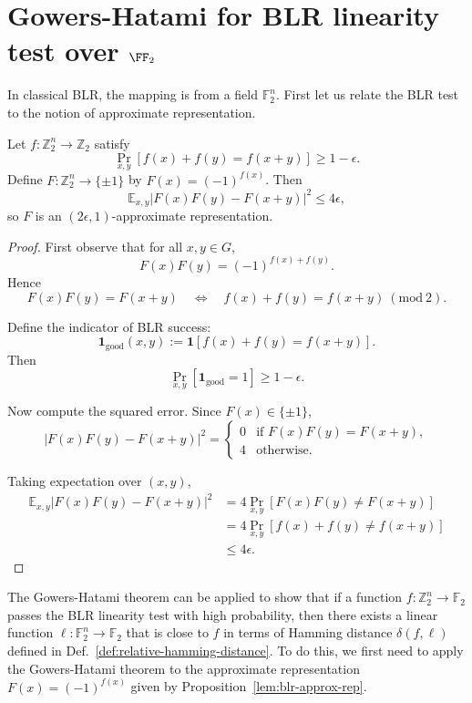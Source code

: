\section{Gowers-Hatami for BLR linearity test over $\FF_2$}

In classical BLR, the mapping is from a field $\mathbb{F}_2^n$. 
First let us relate the BLR test to the notion of approximate representation.

\begin{proposition}\label{lem:blr-approx-rep}
Let $f:\mathbb{Z}_2^n\to \mathbb{Z}_2$ satisfy
\[
\Pr_{x,y}[f(x)+f(y)=f(x+y)] \ge 1-\epsilon.
\]
Define $F:\mathbb{Z}_2^n\to \{\pm1\}$ by $F(x)=(-1)^{f(x)}$. Then
\[
\mathbb{E}_{x,y}\big|F(x)F(y)-F(x+y)\big|^2 \le 4\epsilon,
\]
so $F$ is an $(2\epsilon,1)$-approximate representation.
\end{proposition}

\begin{proof}
    First observe that for all $x,y\in G$,
    \[
    F(x)F(y) = (-1)^{f(x)+f(y)}.
    \]
    Hence
    \[
    F(x)F(y)=F(x+y) \quad \Longleftrightarrow \quad f(x)+f(y)=f(x+y)\ (\mathrm{mod}\ 2).
    \]

    Define the indicator of BLR success:
    \[
    \mathbf{1}_{\mathrm{good}}(x,y) := \mathbf{1}[f(x)+f(y)=f(x+y)].
    \]
    Then
    \[
    \Pr_{x,y}[\mathbf{1}_{\mathrm{good}}=1] \ge 1-\epsilon.
    \]

    Now compute the squared error. Since $F(x)\in\{\pm1\}$,
    \[
    |F(x)F(y)-F(x+y)|^2 =
    \begin{cases}
    0 & \text{if } F(x)F(y)=F(x+y),\\
    4 & \text{otherwise}.
    \end{cases}
    \]

    Taking expectation over $(x,y)$,
    \begin{align*}
    \mathbb{E}_{x,y}|F(x)F(y)-F(x+y)|^2
    &= 4 \Pr_{x,y}[F(x)F(y)\neq F(x+y)] \\
    &= 4 \Pr_{x,y}[f(x)+f(y)\neq f(x+y)] \\
    &\le 4\epsilon.
    \end{align*}
\end{proof}

The Gowers-Hatami theorem can be applied to show that if a function $f: \mathbb{Z}_2^n \to \mathbb{F}_2$ passes the BLR linearity test with high probability, 
then there exists a linear function $\ell: \mathbb{F}_2^n \to \mathbb{F}_2$ that is close to $f$ in terms of Hamming distance $\delta(f, \ell)$ defined in Def.~\ref{def:relative-hamming-distance}.
To do this, we first need to apply the Gowers-Hatami theorem to the approximate representation $F(x)=(-1)^{f(x)}$ given by Proposition~\ref{lem:blr-approx-rep}.

